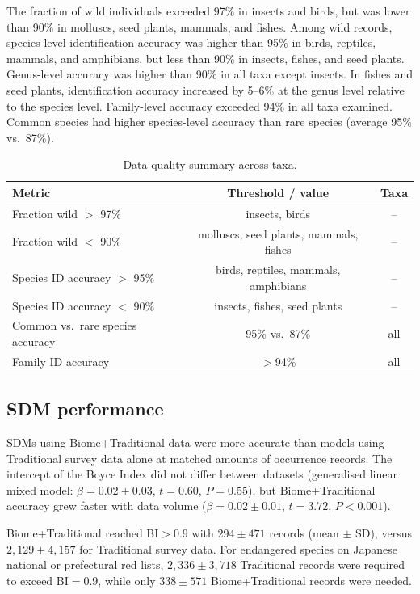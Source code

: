 \documentclass[11pt]{article}
\begin{document}
The fraction of wild individuals exceeded 97\% in insects and birds, but was lower than 90\% in molluscs, seed plants, mammals, and fishes. Among wild records, species-level identification accuracy was higher than 95\% in birds, reptiles, mammals, and amphibians, but less than 90\% in insects, fishes, and seed plants. Genus-level accuracy was higher than 90\% in all taxa except insects. In fishes and seed plants, identification accuracy increased by 5--6\% at the genus level relative to the species level. Family-level accuracy exceeded 94\% in all taxa examined. Common species had higher species-level accuracy than rare species (average 95\% vs.\ 87\%).

\begin{table}[h]
\centering
\caption{Data quality summary across taxa.}
\begin{tabular}{lcc}
\toprule
Metric & Threshold / value & Taxa \\
\midrule
Fraction wild $>$ 97\% & insects, birds & -- \\
Fraction wild $<$ 90\% & molluscs, seed plants, mammals, fishes & -- \\
Species ID accuracy $>$ 95\% & birds, reptiles, mammals, amphibians & -- \\
Species ID accuracy $<$ 90\% & insects, fishes, seed plants & -- \\
Common vs.\ rare species accuracy & 95\% vs.\ 87\% & all \\
Family ID accuracy & $>$94\% & all \\
\bottomrule
\end{tabular}
\end{table}

\subsection{SDM performance}
SDMs using Biome+Traditional data were more accurate than models using Traditional survey data alone at matched amounts of occurrence records. The intercept of the Boyce Index did not differ between datasets (generalised linear mixed model: $\beta=0.02\pm0.03$, $t=0.60$, $P=0.55$), but Biome+Traditional accuracy grew faster with data volume ($\beta=0.02\pm0.01$, $t=3.72$, $P<0.001$).

Biome+Traditional reached BI$>0.9$ with $294 \pm 471$ records (mean $\pm$ SD), versus $2{,}129 \pm 4{,}157$ for Traditional survey data. For endangered species on Japanese national or prefectural red lists, $2{,}336 \pm 3{,}718$ Traditional records were required to exceed BI$=0.9$, while only $338 \pm 571$ Biome+Traditional records were needed.
\end{document}
